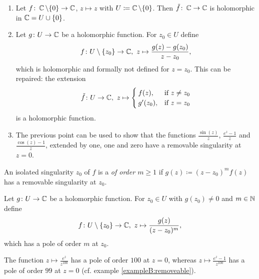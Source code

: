 \documentclass[a4paper,english]{article}
\begin{document}
\begin{exampleB} \label{exampleB:removeable}
    \begin{enumerate}
        \item 
        Let $f\colon \operatorname{\mathbb{C}} \setminus \{ 0 \} \to \operatorname{\mathbb{C}}$, $z \mapsto z$ with $U \coloneqq \operatorname{\mathbb{C}} \setminus \{ 0 \}$.
        Then $\tilde{f}\colon \operatorname{\mathbb{C}} \to \operatorname{\mathbb{C}}$ is holomorphic in $\operatorname{\mathbb{C}} = U \cup \{ 0 \}$.
        
        \item
        Let $g\colon U \to \operatorname{\mathbb{C}}$ be a holomorphic function.
        For $z_0 \in U$ define
        \begin{equation*}
            f\colon U \setminus \{ z_0 \} \to \CC, \ 
            z \mapsto \frac{g(z) - g(z_0)}{z - z_0},
        \end{equation*}
        which is holomorphic and formally not defined for $z = z_0$.
        This can be repaired: the extension
        \begin{equation*}
            \tilde{f}\colon U \to \CC, \ 
            z \mapsto \begin{cases}
                f(z),       & \text{if } z \ne z_0 \\
                g'(z_0),    & \text{if } z = z_0
            \end{cases}
        \end{equation*}
        is a holomorphic function.
        
        \item
        The previous point can be used to show that the functions $\frac{\sin(z)}{z}$, $\frac{e^z - 1}{z}$ and $\frac{\cos(z) - 1}{z}$, extended by one, one and zero have a removable singularity at $z = 0$.
    \end{enumerate}
\end{exampleB}

\begin{defn}[Pole of order $m$] \label{defn:pole}
    An isolated singularity $z_0$ of $f$ is a  \emph{of order $m \ge 1$} if $g(z) \coloneqq (z - z_0)^m f(z)$ has a removable singularity at $z_0$.
\end{defn}

\begin{example}[Poles]
    Let $g \colon U \to \operatorname{\mathbb{C}}$ be a holomorphic function.
    For $z_0 \in U$ with $g(z_0) \ne 0$ and $m \in \operatorname{\mathbb{N}}$ define
    \begin{equation*}
        f \colon U \setminus \{ z_0 \} \to \CC, \ 
        z \mapsto \frac{g(z)}{(z - z_0)^m},
    \end{equation*}
    which has a pole of order $m$ at $z_0$.
    
    The function $z \mapsto \frac{e^z}{z^{100}}$ has a pole of order $100$ at $z = 0$, whereas $z \mapsto \frac{e^z - 1}{z^{100}}$ has a pole of order $99$ at $z = 0$ (cf. example \ref{exampleB:removeable}).
\end{example}
\end{document}
